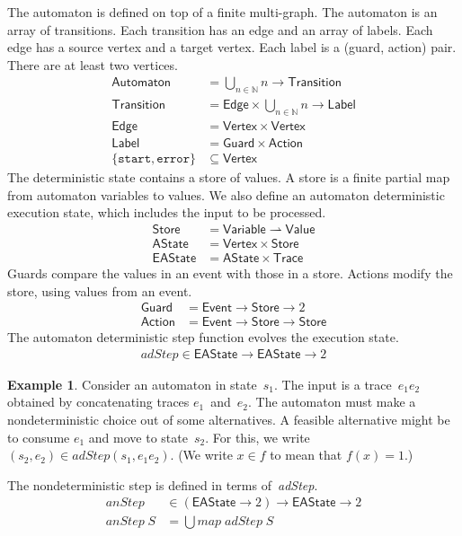 \documentclass[preprint]{sigplanconf} %
\newcommand{\N}{\ensuremath{\mathbb{N}}}
\newcommand{\pmap}{\rightharpoonup}
\newcommand{\set}[1]{\ensuremath{\mathsf{#1}}}
\theoremstyle{definition}
\newtheorem{example}{Example}
\begin{document}
The automaton is defined on top of a finite multi-graph.
The automaton is an array of transitions.
Each transition has an edge and an array of labels.
Each edge has a source vertex and a target vertex.
Each label is a (guard, action) pair.
There are at least two vertices.
\begin{align}
\set{Automaton} &= \bigcup_{n\in\N} n \to \set{Transition} \\
\set{Transition} &= \set{Edge}\times \bigcup_{n\in\N} n\to\set{Label} \\
\set{Edge}&=\set{Vertex}\times\set{Vertex} \\
\set{Label}&=\set{Guard}\times\set{Action} \\
\{\mathtt{start},\mathtt{error}\}&\subseteq\set{Vertex}
\end{align}
The deterministic state contains a store of values.
A store is a finite partial map from automaton variables to values.
We also define an automaton deterministic execution state, which includes the input to be processed.
\begin{align}
\set{Store}&=\set{Variable}\pmap\set{Value} \\
\set{AState}&=\set{Vertex}\times\set{Store} \\
\set{EAState}&=\set{AState}\times\set{Trace}
\end{align}
Guards compare the values in an event with those in a store.
Actions modify the store, using values from an event.
\begin{align}
\set{Guard}&=\set{Event}\to\set{Store}\to2 \\
\set{Action}&=\set{Event}\to\set{Store}\to\set{Store}
\end{align}
The automaton deterministic step function evolves the execution state.
\begin{align}
\mathit{adStep}\in\set{EAState}\to\set{EAState}\to2
\end{align}
\begin{example}
Consider an automaton in state~$s_1$.
The input is a trace~$e_1e_2$ obtained by concatenating traces $e_1$~and~$e_2$.
The automaton must make a nondeterministic choice out of some alternatives.
A feasible alternative might be to consume $e_1$ and move to state~$s_2$.
For this, we write $(s_2,e_2)\in\mathit{adStep}(s_1,e_1e_2)$.
(We write $x\in f$ to mean that $f(x)=1$.)
\end{example}
The nondeterministic step is defined in terms of~\textit{adStep}.
\begin{align}
\mathit{anStep}&\in(\set{EAState}\to2)\to\set{EAState}\to2 \\
\mathit{anStep}\;S&=\bigcup \mathit{map}\;\mathit{adStep}\;S
\end{align}
\end{document}
